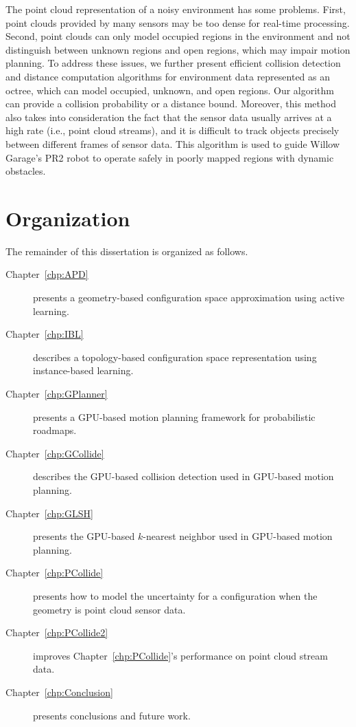 The point cloud representation of a noisy environment has some problems. First, point clouds provided by many
sensors may be too dense for real-time processing. Second, point clouds can only model occupied
regions in the environment and not distinguish between unknown regions and open regions, which may impair motion planning. To address these issues, we further present efficient collision detection and
distance computation algorithms for environment data represented as an octree, which can model occupied,
unknown, and open regions. Our algorithm can provide a collision probability or a distance bound. Moreover,
this method also takes into consideration the fact that the sensor data usually arrives at a high rate (i.e., point cloud streams), and it is
difficult to track objects precisely between different frames of sensor data. This algorithm is used to guide Willow Garage's PR2 robot to operate safely in
poorly mapped regions with dynamic obstacles.

\section{Organization}
The remainder of this dissertation is organized as follows.

 \begin{description}
 \item[Chapter~\ref{chp:APD}] presents a geometry-based configuration space approximation using active learning.
 \item[Chapter~\ref{chp:IBL}] describes a topology-based configuration space representation using instance-based learning.
 \item[Chapter~\ref{chp:GPlanner}] presents a GPU-based motion planning framework for probabilistic roadmaps.
 \item[Chapter~\ref{chp:GCollide}] describes the GPU-based collision detection used in GPU-based motion planning.
 \item[Chapter~\ref{chp:GLSH}] presents the GPU-based $k$-nearest neighbor used in GPU-based motion planning.
 \item[Chapter~\ref{chp:PCollide}] presents how to model the uncertainty for a configuration when the geometry is point cloud sensor data.
 \item[Chapter~\ref{chp:PCollide2}] improves Chapter~\ref{chp:PCollide}'s performance on point cloud stream data.
 \item[Chapter~\ref{chp:Conclusion}] presents conclusions and future work.
 \end{description}


